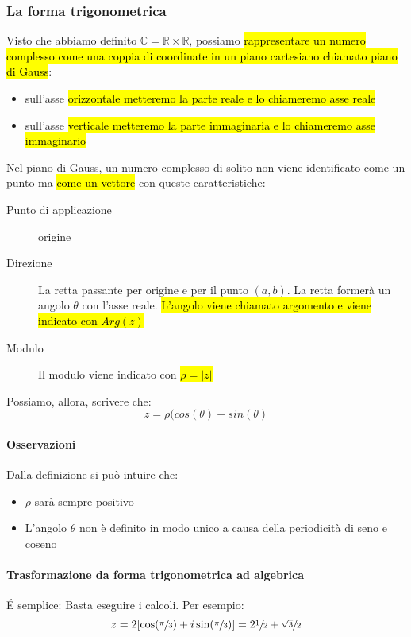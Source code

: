 \subsubsection{La forma trigonometrica}
Visto che abbiamo definito $\mathbb{C} = \mathbb{R} \times \mathbb{R}$, possiamo
\hl{rappresentare un numero complesso come una coppia di coordinate in un piano 
cartesiano chiamato piano di Gauss}:
\begin{itemize}
    \item sull'asse \hl{orizzontale metteremo la parte reale e lo chiameremo asse
        reale}
    \item sull'asse \hl{verticale metteremo la parte immaginaria e lo chiameremo 
        asse immaginario}
\end{itemize}

Nel piano di Gauss, un numero complesso di solito non viene identificato come un
punto ma \hl{come un vettore} con queste caratteristiche:
\begin{description}
    \item[Punto di applicazione] origine
    \item[Direzione] La retta passante per origine e per il punto $(a,b)$. La 
        retta formerà un angolo $\theta$ con l'asse reale. \hl{L'angolo viene 
        chiamato argomento e viene indicato con $Arg(z)$}
    \item[Modulo] Il modulo viene indicato con \hl{$\rho = |z|$}
\end{description}
Possiamo, allora, scrivere che:
\[z = \rho(cos(\theta) + sin(\theta)\]

\paragraph{Osservazioni} Dalla definizione si può intuire che:
\begin{itemize}
    \item $\rho$ sarà sempre positivo 
    \item L'angolo $\theta$ non è definito in modo unico a causa della periodicità
        di seno e coseno
\end{itemize}

\paragraph{Trasformazione da forma trigonometrica ad algebrica} \'E semplice: 
Basta eseguire i calcoli. Per esempio:
\[ z = 2[\cos(\sfrac{\pi}{3}) + i\sin(\sfrac{\pi}{3})] = 2\sfrac{1}{2} + \sfrac{\sqrt{3}}{2} \]

